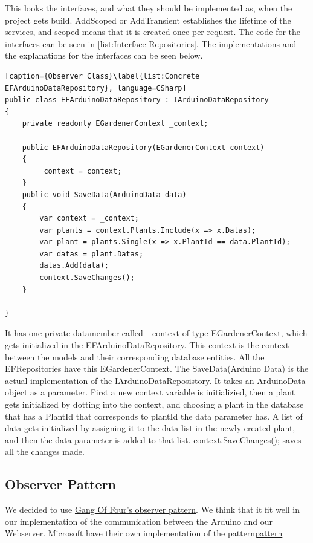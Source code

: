 \documentclass[a4paper,12pt,twoside,openright,titlepage]{book}
\begin{document}
This looks the interfaces, and what they should be implemented as, when the project gets build. AddScoped or AddTransient establishes the lifetime of the services, and scoped means that it is created once per request. The code for the interfaces can be seen in \ref{list:Interface Repositories}. The implementations and the explanations for the interfaces can be seen below.

\begin{lstlisting}[caption={Observer Class}\label{list:Concrete EFArduinoDataRepository}, language=CSharp]
public class EFArduinoDataRepository : IArduinoDataRepository
{
	private readonly EGardenerContext _context;
        
	public EFArduinoDataRepository(EGardenerContext context)
	{
        _context = context;
	}
	public void SaveData(ArduinoData data)
	{
		var context = _context;
		var plants = context.Plants.Include(x => x.Datas);
	    var plant = plants.Single(x => x.PlantId == data.PlantId);
        var datas = plant.Datas;
        datas.Add(data);
		context.SaveChanges();
	}

}
\end{lstlisting}

It has one private datamember called \_context of type EGardenerContext, which gets initialized in the EFArduinoDataRepository. This context is the context between the models and their corresponding database entities. All the EFRepositories have this EGardenerContext. The SaveData(Arduino Data) is the actual implementation of the IArduinoDataReposistory. It takes an ArduinoData object as a parameter. First a new context variable is initializied, then a plant gets initialized by dotting into the context, and choosing a plant in the database that has a PlantId that corresponds to plantId the data parameter has. A list of data gets initialized by assigning it to the data list in the newly created plant, and then the data parameter is added to that list. context.SaveChanges(); saves all the changes made.  

\subsection{Observer Pattern}
We decided to use \href{https://en.wikipedia.org/wiki/Observer_pattern}{Gang Of Four's observer pattern}. We think that it fit well in our implementation of the communication between the Arduino and our Webserver. Microsoft have their own implementation of the pattern\href{https://docs.microsoft.com/en-us/dotnet/standard/events/observer-design-pattern}{pattern}
 
\end{document}
